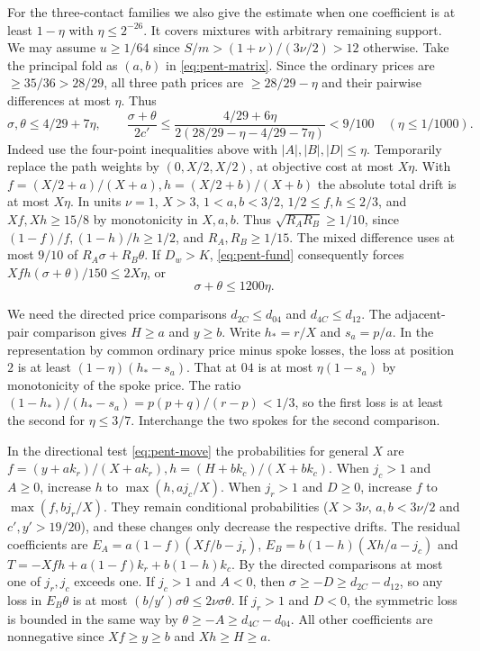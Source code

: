 \documentclass[11pt,a4paper]{article}
\theoremstyle{definition}
\begin{document}
For the three-contact families we also give the estimate when one
coefficient is at least $1-\eta$ with $\eta\le2^{-26}$. It covers mixtures
with arbitrary remaining support. We may assume $u\ge1/64$ since
$S/m>(1+\nu)/(3\nu/2)>12$ otherwise. Take the principal fold as
$(a,b)$ in \eqref{eq:pent-matrix}. Since the ordinary prices are
$\ge35/36>28/29$, all three path prices are $\ge28/29-\eta$ and their
pairwise differences at most $\eta$. Thus
\[
 \sigma,\theta\le4/29+7\eta,\qquad
 \frac{\sigma+\theta}{2c'}\le
 \frac{4/29+6\eta}{2(28/29-\eta-4/29-7\eta)}<9/100
 \quad(\eta\le1/1000).
\]
Indeed use the four-point inequalities above with
$|A|,|B|,|D|\le\eta$. Temporarily replace the path weights by
$(0,X/2,X/2)$, at objective cost at most $X\eta$. With
$f=(X/2+a)/(X+a),h=(X/2+b)/(X+b)$ the absolute total drift is
at most $X\eta$. In units $\nu=1$, $X>3$, $1<a,b<3/2$,
$1/2\le f,h\le2/3$, and $Xf,Xh\ge15/8$ by monotonicity in $X,a,b$.
Thus $\sqrt{R_A R_B}\ge1/10$, since $(1-f)/f,(1-h)/h\ge1/2$,
and $R_A,R_B\ge1/15$. The mixed difference uses at most $9/10$ of
$R_A\sigma+R_B\theta$. If $D_w>K$, \eqref{eq:pent-fund} consequently
forces $Xfh(\sigma+\theta)/150\le2X\eta$, or
\begin{equation}\label{eq:pent-tiny}
 \sigma+\theta\le1200\eta .
\end{equation}

We need the directed price comparisons $d_{2C}\le d_{04}$ and
$d_{4C}\le d_{12}$. The adjacent-pair comparison gives $H\ge a$ and
$y\ge b$. Write $h_*=r/X$ and $s_a=p/a$. In the representation by
common ordinary price minus spoke losses, the loss at position $2$
is at least $(1-\eta)(h_*-s_a)$. That at $04$ is at most
$\eta(1-s_a)$ by monotonicity of the spoke price. The ratio
$(1-h_*)/(h_*-s_a)=p(p+q)/(r-p)<1/3$, so the first loss is at least
the second for $\eta\le3/7$. Interchange the two spokes for the second
comparison.

In the directional test \eqref{eq:pent-move} the probabilities for general $X$ are
$f=(y+ak_r)/(X+ak_r), h=(H+bk_c)/(X+bk_c)$.
When $j_c>1$ and $A\ge0$, increase $h$ to $\max(h,aj_c/X)$.
When $j_r>1$ and $D\ge0$, increase $f$ to $\max(f,bj_r/X)$.
They remain conditional probabilities ($X>3\nu$, $a,b<3\nu/2$ and
$c',y'>19/20$), and these changes only decrease the respective drifts.
The residual coefficients are $E_A=a(1-f)(Xf/b-j_r)$,
$E_B=b(1-h)(Xh/a-j_c)$ and
$T=-Xfh+a(1-f)k_r+b(1-h)k_c$.
By the directed comparisons at most one of $j_r,j_c$ exceeds one.
If $j_c>1$ and $A<0$, then $\sigma\ge-D\ge d_{2C}-d_{12}$, so any
loss in $E_B\theta$ is at most $(b/y')\sigma\theta\le2\nu\sigma\theta$.
If $j_r>1$ and $D<0$, the symmetric loss is bounded in the same way
by $\theta\ge-A\ge d_{4C}-d_{04}$. All other coefficients are
nonnegative since $Xf\ge y\ge b$ and $Xh\ge H\ge a$.
\end{document}
